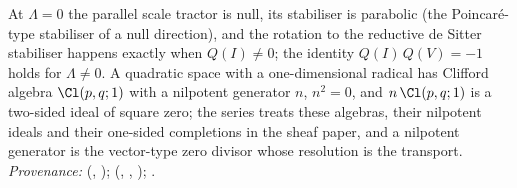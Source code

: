 At $\Lambda = 0$ the parallel scale tractor is null, its stabiliser is parabolic (the Poincar\'e-type stabiliser of a null direction), and the rotation to the reductive de Sitter stabiliser happens exactly when $Q(I) \neq 0$; the identity $Q(I)\,Q(V) = -1$ holds for $\Lambda \neq 0$. A quadratic space with a one-dimensional radical has Clifford algebra $\Cl(p,q;1)$ with a nilpotent generator $n$, $n^{2} = 0$, and $n\,\Cl(p,q;1)$ is a two-sided ideal of square zero; the series treats these algebras, their nilpotent ideals and their one-sided completions in the sheaf paper, and a nilpotent generator is the vector-type zero divisor whose resolution is the transport. \emph{Provenance:} \cite[Fact~2.1, Thm.~3.1]{ButlerT10} (, ); \cite[Thm.~3.1, Prop.~3.4, Thm.~4.4]{ButlerT4} (, , ); \cite[\S 4]{ButlerT1}.
